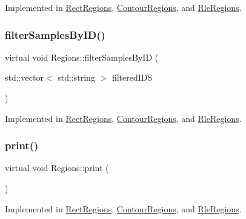 Implemented in \hyperlink{struct_rect_regions_a4ec356e30d899d9a49fce3fe95f73d34}{Rect\+Regions}, \hyperlink{struct_contour_regions_ab8b13783859be86bdffa78c3a61e1387}{Contour\+Regions}, and \hyperlink{struct_rle_regions_acaea73c92cdcff78a60d1e10bed62c3d}{Rle\+Regions}.

\mbox{\label{struct_regions_ae2bcea2b1c245a9d1ab1ff3abc23f2a0}} 
\subsubsection{\texorpdfstring{filter\+Samples\+By\+I\+D()}{filterSamplesByID()}}
{\footnotesize\ttfamily virtual void Regions\+::filter\+Samples\+By\+ID (\begin{DoxyParamCaption}\item[{std\+::vector$<$ std\+::string $>$}]{filtered\+I\+DS }\end{DoxyParamCaption})\hspace{0.3cm}{\ttfamily [pure virtual]}}



Implemented in \hyperlink{struct_rect_regions_a8eff732b9c2308dae4e0ff45f147cb51}{Rect\+Regions}, \hyperlink{struct_contour_regions_a8320d00da57b3362afb70f6886919534}{Contour\+Regions}, and \hyperlink{struct_rle_regions_a50e7df1873c11d5436cbe875593c331b}{Rle\+Regions}.

\mbox{\label{struct_regions_a5a19f40bc0d2226f244625b88fbf8e59}} 
\subsubsection{\texorpdfstring{print()}{print()}}
{\footnotesize\ttfamily virtual void Regions\+::print (\begin{DoxyParamCaption}{ }\end{DoxyParamCaption})\hspace{0.3cm}{\ttfamily [pure virtual]}}



Implemented in \hyperlink{struct_rect_regions_a6ce45dd2b9d9f0f3424d4c6d656652c2}{Rect\+Regions}, \hyperlink{struct_contour_regions_a9bd987b6b8a1cc27f5ece5b321f1b9ba}{Contour\+Regions}, and \hyperlink{struct_rle_regions_a83e335ebc08dd7029bdc76baa8b71b32}{Rle\+Regions}.

